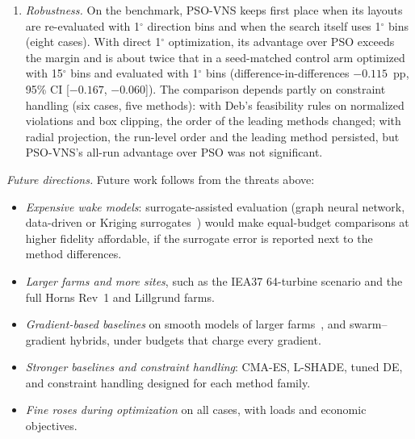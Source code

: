 \begin{enumerate}
\item \emph{Robustness.} On the benchmark, PSO-VNS keeps first place when its layouts are re-evaluated with 1$^\circ$ direction bins and when the search itself uses 1$^\circ$ bins (eight cases). With direct 1$^\circ$ optimization, its advantage over PSO exceeds the margin and is about twice that in a seed-matched control arm optimized with 15$^\circ$ bins and evaluated with 1$^\circ$ bins (difference-in-differences $-0.115$~pp, 95\% CI [$-0.167$, $-0.060$]). The comparison depends partly on constraint handling (six cases, five methods): with Deb's feasibility rules on normalized violations and box clipping, the order of the leading methods changed; with radial projection, the run-level order and the leading method persisted, but PSO-VNS's all-run advantage over PSO was not significant.
\end{enumerate}

\emph{Future directions.} Future work follows from the threats above:
\begin{itemize}
\item \emph{Expensive wake models}: surrogate-assisted evaluation (graph neural network, data-driven or Kriging surrogates~\cite{Yang2023,Wang2024,Li2025}) would make equal-budget comparisons at higher fidelity affordable, if the surrogate error is reported next to the method differences.
\item \emph{Larger farms and more sites}, such as the IEA37 64-turbine scenario and the full Horns Rev~1 and Lillgrund farms.
\item \emph{Gradient-based baselines} on smooth models of larger farms~\cite{Rodrigues2024}, and swarm--gradient hybrids, under budgets that charge every gradient.
\item \emph{Stronger baselines and constraint handling}: CMA-ES, L-SHADE, tuned DE, and constraint handling designed for each method family.
\item \emph{Fine roses during optimization} on all cases, with loads and economic objectives.
\end{itemize}

